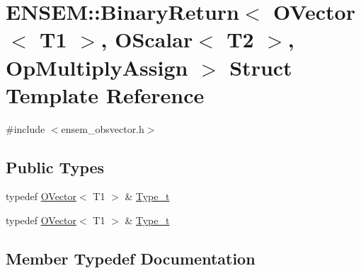 \hypertarget{structENSEM_1_1BinaryReturn_3_01OVector_3_01T1_01_4_00_01OScalar_3_01T2_01_4_00_01OpMultiplyAssign_01_4}{}\section{E\+N\+S\+EM\+:\+:Binary\+Return$<$ O\+Vector$<$ T1 $>$, O\+Scalar$<$ T2 $>$, Op\+Multiply\+Assign $>$ Struct Template Reference}
\label{structENSEM_1_1BinaryReturn_3_01OVector_3_01T1_01_4_00_01OScalar_3_01T2_01_4_00_01OpMultiplyAssign_01_4}


{\ttfamily \#include $<$ensem\+\_\+obsvector.\+h$>$}

\subsection*{Public Types}
\begin{DoxyCompactItemize}
\item 
typedef \mbox{\hyperlink{classENSEM_1_1OVector}{O\+Vector}}$<$ T1 $>$ \& \mbox{\hyperlink{structENSEM_1_1BinaryReturn_3_01OVector_3_01T1_01_4_00_01OScalar_3_01T2_01_4_00_01OpMultiplyAssign_01_4_ae9e6b3f41826781c1bb6c57960320674}{Type\+\_\+t}}
\item 
typedef \mbox{\hyperlink{classENSEM_1_1OVector}{O\+Vector}}$<$ T1 $>$ \& \mbox{\hyperlink{structENSEM_1_1BinaryReturn_3_01OVector_3_01T1_01_4_00_01OScalar_3_01T2_01_4_00_01OpMultiplyAssign_01_4_ae9e6b3f41826781c1bb6c57960320674}{Type\+\_\+t}}
\end{DoxyCompactItemize}


\subsection{Member Typedef Documentation}
\mbox{\label{structENSEM_1_1BinaryReturn_3_01OVector_3_01T1_01_4_00_01OScalar_3_01T2_01_4_00_01OpMultiplyAssign_01_4_ae9e6b3f41826781c1bb6c57960320674}} 
